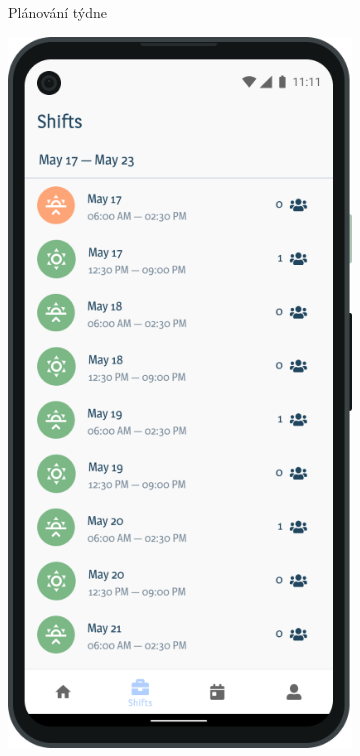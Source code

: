 \documentclass[a4paper,11pt,openany,twoside]{book}
\begin{document}
\begin{figure}
\begin{subfigure}{0.34\textwidth}
				 \caption{Plánování týdne}
				 \label{sub:android2}
  \end{subfigure}
	\vspace{1em}
	\begin{subfigure}{0.34\textwidth}
         \centering
         \includegraphics[width=\textwidth]{img/empty-shifts.png}

\end{subfigure}
\end{figure}
\end{document}
